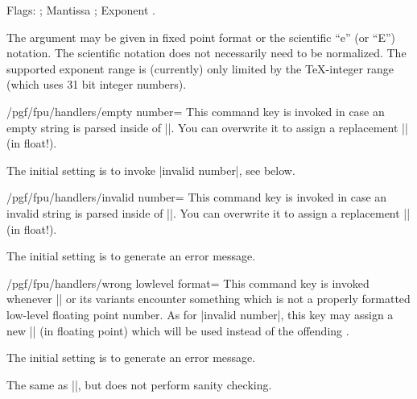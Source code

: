 \begin{command}{\pgfmathfloatparsenumber{}}
\begin{codeexample}[]
\pgfmathfloattomacro{\pgfmathresult}{\F}{\M}{\E}
Flags: \F; Mantissa \M; Exponent \E.
\end{codeexample}
    The argument  may be given in fixed point format or the scientific
    ``e'' (or ``E'') notation. The scientific notation does not necessarily
    need to be normalized. The supported exponent range is (currently) only
    limited by the \TeX-integer range (which uses 31 bit integer numbers).
\end{command}

\begin{key}{/pgf/fpu/handlers/empty number=}
    This command key is invoked in case an empty string is parsed inside of
    |\pgfmathfloatparsenumber|. You can overwrite it to assign a replacement
    |\pgfmathresult| (in float!).

    The initial setting is to invoke |invalid number|, see below.
\end{key}

\begin{key}{/pgf/fpu/handlers/invalid number=}
    This command key is invoked in case an invalid string is parsed inside of
    |\pgfmathfloatparsenumber|. You can overwrite it to assign a replacement
    |\pgfmathresult| (in float!).

    The initial setting is to generate an error message.
\end{key}

\begin{key}{/pgf/fpu/handlers/wrong lowlevel format=}
    This command key is invoked whenever |\pgfmathfloattoregisters| or its
    variants encounter something which is not a properly formatted low-level
    floating point number. As for |invalid number|, this key may assign a new
    |\pgfmathresult| (in floating point) which will be used instead of the
    offending .

    The initial setting is to generate an error message.
\end{key}

\begin{command}{\pgfmathfloatqparsenumber{}}
    The same as |\pgfmathfloatparsenumber|, but does not perform sanity checking.
\end{command}

